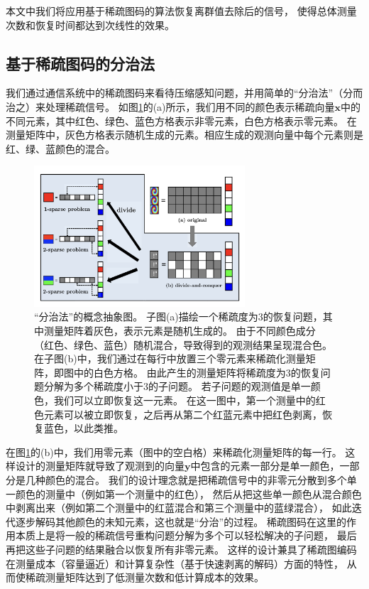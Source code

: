\documentclass[AutoFakeBold]{LZUThesis}
\begin{document}
本文中我们将应用基于稀疏图码的算法恢复离群值去除后的信号，
使得总体测量次数和恢复时间都达到次线性的效果。

\subsection{基于稀疏图码的分治法}
\label{d_n_c}

我们通过通信系统中的稀疏图码来看待压缩感知问题，并用简单的“分治法”（分而治之）来处理稀疏信号。
如图\ref{fig_divide_conquer}的(a)所示，我们用不同的颜色表示稀疏向量$\mathbf{x}$中的不同元素，其中红色、绿色、蓝色方格表示非零元素，白色方格表示零元素。
在测量矩阵中，灰色方格表示随机生成的元素。相应生成的观测向量中每个元素则是红、绿、蓝颜色的混合。
\begin{figure}[H]
    \centering
    \includegraphics[width=0.7\textwidth]{figures/d_n_c.png}
    \caption{“分治法”的概念抽象图。
    子图(a)描绘一个稀疏度为3的恢复问题，其中测量矩阵着灰色，表示元素是随机生成的。
    由于不同颜色成分（红色、绿色、蓝色）随机混合，导致得到的观测结果呈现混合色。
    在子图(b)中，我们通过在每行中放置三个零元素来稀疏化测量矩阵，即图中的白色方格。
    由此产生的测量矩阵将稀疏度为3的恢复问题分解为多个稀疏度小于3的子问题。
    若子问题的观测值是单一颜色，我们可以立即恢复这一元素。
    在这一图中，第一个测量中的红色元素可以被立即恢复，之后再从第二个红蓝元素中把红色剥离，恢复蓝色，以此类推。}
    \label{fig_divide_conquer}
\end{figure}
在图\ref{fig_divide_conquer}的(b)中，我们用零元素（图中的空白格）来稀疏化测量矩阵的每一行。
这样设计的测量矩阵就导致了观测到的向量$\mathbf{y}$中包含的元素一部分是单一颜色，一部分是几种颜色的混合。
我们的设计理念就是把稀疏信号中的非零元分散到多个单一颜色的测量中（例如第一个测量中的红色），
然后从把这些单一颜色从混合颜色中剥离出来（例如第二个测量中的红蓝混合和第三个测量中的蓝绿混合），
如此迭代逐步解码其他颜色的未知元素，这也就是“分治”的过程。
稀疏图码在这里的作用本质上是将一般的稀疏信号重构问题分解为多个可以轻松解决的子问题，
最后再把这些子问题的结果融合以恢复所有非零元素。
这样的设计兼具了稀疏图编码在测量成本（容量逼近）和计算复杂性（基于快速剥离的解码）方面的特性，
从而使稀疏测量矩阵达到了低测量次数和低计算成本的效果。
\end{document}
